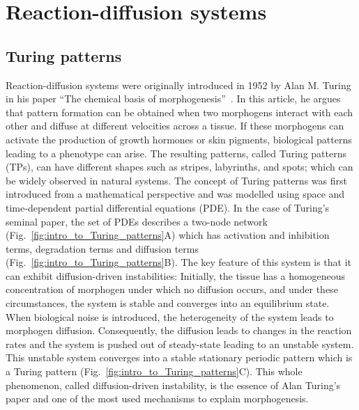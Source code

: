 \section{Reaction-diffusion systems}
\subsection{Turing patterns}
Reaction-diffusion systems were originally introduced in 1952 by Alan M. Turing in his paper “The chemical basis of morphogenesis”~\parencite{Turing1952}.
In this article, he argues that pattern formation can be obtained when two morphogens interact with each other and diffuse at different
velocities across a tissue.
If these morphogens can activate the production of growth hormones or skin pigments, biological patterns leading to a phenotype can arise.
The resulting patterns, called Turing patterns (TPs), can have different shapes such as stripes, labyrinths, and spots; which can be widely observed in natural systems.
The concept of Turing patterns was first introduced from a mathematical perspective and was modelled using space and time-dependent partial differential equations (PDE). In the case of Turing’s seminal paper, the set of PDEs describes a two-node network (Fig.~\ref{fig:intro_to_Turing_patterns}A) which has activation and inhibition terms, degradation terms and diffusion terms (Fig.~\ref{fig:intro_to_Turing_patterns}B).
The key feature of this system is that it can exhibit diffusion-driven instabilities: Initially, the tissue has a homogeneous concentration of morphogen under which no diffusion occurs, and under these circumstances, the system is stable and converges into an equilibrium state.
When biological noise is introduced, the heterogeneity of the system leads to morphogen diffusion.
Consequently, the diffusion leads to changes in the reaction rates and the system is pushed out of steady-state leading to an unstable system.
This unstable system converges into a stable stationary periodic pattern which is a Turing pattern (Fig.~\ref{fig:intro_to_Turing_patterns}C).
This whole phenomenon, called diffusion-driven instability, is the essence of Alan Turing’s paper and one of the most used mechanisms to explain morphogenesis.

